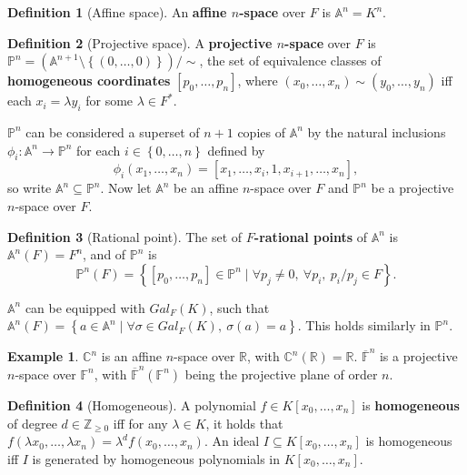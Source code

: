 \documentclass{article}
\newcommand{\F}{\mathbb{F}}
\newcommand{\Z}{\mathbb{Z}}
\newcommand{\R}{\mathbb{R}}
\newcommand{\C}{\mathbb{C}}
\newcommand{\A}{\mathbb{A}}
\renewcommand{\P}{\mathbb{P}}
\newcommand{\rb}[1]{\left( #1 \right)}
\renewcommand{\sb}[1]{\left[ #1 \right]}
\newcommand{\cb}[1]{\left\{ #1 \right\}}
\theoremstyle{definition}
\newtheorem*{definition}{Definition}
\newtheorem*{example}{Example}
\begin{document}
\begin{definition}[Affine space]
An \textbf{affine $ n $-space} over $ F $ is $ \A^n = K^n $.
\end{definition}

\begin{definition}[Projective space]
A \textbf{projective $ n $-space} over $ F $ is $ \P^n = \rb{\A^{n + 1} \setminus \cb{\rb{0, \dots, 0}}} / \sim $, the set of equivalence classes of \textbf{homogeneous coordinates} $ \sb{p_0, \dots, p_n} $, where $ \rb{x_0, \dots, x_n} \sim \rb{y_0, \dots, y_n} $ iff each $ x_i = \lambda y_i $ for some $ \lambda \in F^* $.
\end{definition}

$ \P^n $ can be considered a superset of $ n + 1 $ copies of $ \A^n $ by the natural inclusions $ \phi_i : \A^n \to \P^n $ for each $ i \in \cb{0, \dots, n} $ defined by
$$ \phi_i\rb{x_1, \dots, x_n} = \sb{x_1, \dots, x_i, 1, x_{i + 1}, \dots, x_n}, $$
so write $ \A^n \subseteq \P^n $. Now let $ \A^n $ be an affine $ n $-space over $ F $ and $ \P^n $ be a projective $ n $-space over $ F $.

\begin{definition}[Rational point]
The set of \textbf{$ F $-rational points} of $ \A^n $ is $ \A^n\rb{F} = F^n $, and of $ \P^n $ is
$$ \P^n\rb{F} = \cb{\sb{p_0, \dots, p_n} \in \P^n \mid \forall p_j \ne 0, \ \forall p_i, \ p_i / p_j \in F}. $$
\end{definition}

$ \A^n $ can be equipped with $ Gal_F\rb{K} $, such that $ \A^n\rb{F} = \cb{a \in \A^n \mid \forall \sigma \in Gal_F\rb{K}, \ \sigma\rb{a} = a} $. This holds similarly in $ \P^n $.

\begin{example}
$ \C^n $ is an affine $ n $-space over $ \R $, with $ \C^n\rb{\R} = \R $. $ \overline{\F}^n $ is a projective $ n $-space over $ \F^n $, with $ \overline{\F}^n\rb{\F^n} $ being the projective plane of order $ n $.
\end{example}

\begin{definition}[Homogeneous]
A polynomial $ f \in K\sb{x_0, \dots, x_n} $ is \textbf{homogeneous} of degree $ d \in \Z_{\ge 0} $ iff for any $ \lambda \in K $, it holds that $ f\rb{\lambda x_0, \dots, \lambda x_n} = \lambda^d f\rb{x_0, \dots, x_n} $. An ideal $ I \subseteq K\sb{x_0, \dots, x_n} $ is homogeneous iff $ I $ is generated by homogeneous polynomials in $ K\sb{x_0, \dots, x_n} $.
\end{definition}
\end{document}
